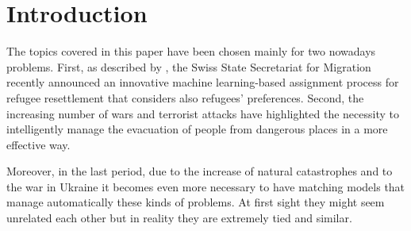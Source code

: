 \section{Introduction}\label{introduction}


The topics covered in this paper have been chosen mainly for two nowadays problems. First, as described by \citet{olbergml}, the Swiss State Secretariat for Migration recently announced an innovative machine learning-based assignment process for refugee resettlement that considers also refugees' preferences. Second, the increasing number of wars and terrorist attacks have highlighted the necessity to intelligently manage the evacuation of people from dangerous places in a more effective way.

Moreover, in the last period, due to the increase of natural catastrophes and to the war in Ukraine it becomes even more necessary to have matching models that manage automatically  these kinds of problems. At first sight they might seem unrelated each other but in reality they are extremely tied and similar.
